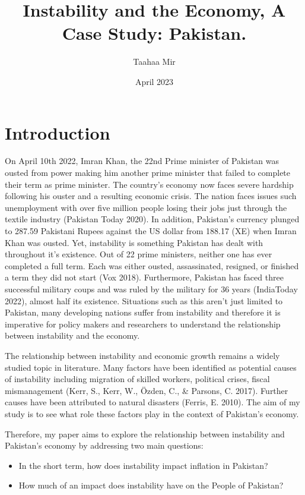 \documentclass[11pt]{article}
\title{ Instability and the Economy, A Case Study: Pakistan. }
\author{ Taahaa Mir }
\date{April 2023}
\begin{document}
\maketitle

\newpage


\section{Introduction}

On April 10th 2022, Imran Khan, the 22nd Prime minister of Pakistan was ousted from power making him another prime minister that failed to complete their term as prime minister. The country’s economy now faces severe hardship following his ouster and a resulting economic crisis. The nation faces issues such unemployment with over five million people losing their jobs just through the textile industry (Pakistan Today 2020). In addition, Pakistan’s currency plunged to 287.59 Pakistani Rupees against the US dollar from 188.17 (XE) when Imran Khan was ousted. Yet, instability is something Pakistan has dealt with throughout it’s existence. Out of 22 prime ministers, neither one has ever completed a full term. Each was either ousted, assassinated, resigned, or finished a term they did not start (Vox 2018). Furthermore, Pakistan has faced three successful military coups and was ruled by the military for 36 years (IndiaToday 2022), almost half its existence. Situations such as this aren’t just limited to Pakistan, many developing nations suffer from instability and therefore it is imperative for policy makers and researchers to understand the relationship between instability and the economy. \newline

The relationship between instability and economic growth remains a widely studied topic in literature. Many factors have been identified as potential causes of instability including migration of skilled workers, political crises, fiscal mismanagement (Kerr, S., Kerr, W., Özden, C., \& Parsons, C. 2017). Further causes have been attributed to natural disasters (Ferris, E. 2010). The aim of my study is to see what role these factors play in the context of Pakistan’s economy. \newline

Therefore, my paper aims to explore the relationship between instability and Pakistan’s economy by addressing two main questions:
\begin{itemize}
    \item In the short term, how does instability impact inflation in Pakistan?
    \item How much of an impact does instability have on the People of Pakistan?
\end{itemize}
\end{document}
